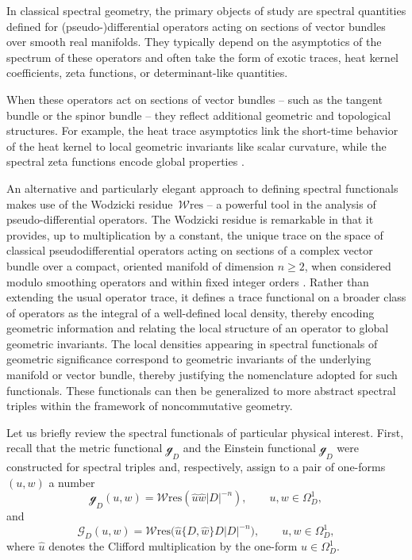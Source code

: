 \documentclass[10pt,a4paper]{amsart}
\numberwithin{equation}{section}
\theoremstyle{definition}
\def\W{\mathscr{W} \mathrm{res}}
\begin{document}
In classical spectral geometry, the primary objects of study are spectral quantities defined for (pseudo-)differential operators acting on sections of vector bundles over smooth real manifolds. They typically depend on the asymptotics of the spectrum of these operators and often take the form of exotic traces, heat kernel coefficients, zeta functions, or determinant-like quantities.

When these operators act on sections of vector bundles -- such as the tangent bundle or the spinor bundle -- they reflect additional geometric and topological structures. For example, the heat trace asymptotics link the short-time behavior of the heat kernel to local geometric invariants like scalar curvature, while the spectral zeta functions encode global properties \cite{Gilkey, Gilkey2}.

An alternative and particularly elegant approach to defining spectral functionals makes use of the Wodzicki residue~$\W$ -- a powerful tool in the analysis of pseudo-differential operators. The Wodzicki residue is remarkable in that it provides, up to multiplication by a constant, the unique trace on the space of classical pseudodifferential operators acting on sections of a complex vector bundle over a compact, oriented manifold of dimension $n\geq 2$, when considered modulo smoothing operators and within fixed integer orders \cite{Guillemin,Wodzicki}. Rather than extending the usual operator trace, it defines a trace functional on a broader class of operators as the integral of a well-defined local density, thereby encoding geometric information and relating the local structure of an operator to global geometric invariants. The local densities appearing in spectral functionals of geometric significance correspond to geometric invariants of the underlying manifold or vector bundle, thereby justifying the nomenclature adopted for such functionals. These functionals can then be generalized to more abstract spectral triples within the framework of noncommutative geometry.

Let us briefly review the spectral functionals of particular physical interest. First, recall that the metric functional $\mathscr{g}_D$ and the Einstein functional $\mathscr{g}_D$ were constructed for spectral triples \cite[Definition~5.4]{dabrowski2023} and, respectively, assign to a pair of one-forms $(u,w)$ a number
\[
	\mathscr{g}_D(u,w)=\W(\hat{u}\hat{w}|D|^{-n}), \qquad u,w\in \Omega_D^1,
\]
and
\[
	\mathscr{G}_D(u,w)=\W\bigl(\hat{u}\{D,\hat{w}\} D |D|^{-n}\bigr), \qquad u,w\in \Omega_D^1,
\]
where $\hat{u}$ denotes the Clifford multiplication by the one-form $u\in \Omega^1_D$.
\end{document}
